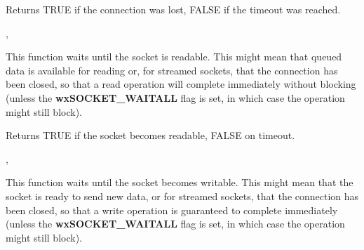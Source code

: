 


Returns TRUE if the connection was lost, FALSE if the timeout was reached.


,

%
%
\label{wxsocketbasewaitforread}


This function waits until the socket is readable. This might mean that
queued data is available for reading or, for streamed sockets, that
the connection has been closed, so that a read operation will complete
immediately without blocking (unless the {\bf wxSOCKET\_WAITALL} flag
is set, in which case the operation might still block).





Returns TRUE if the socket becomes readable, FALSE on timeout.


, 

%
%
\label{wxsocketbasewaitforwrite}


This function waits until the socket becomes writable. This might mean that
the socket is ready to send new data, or for streamed sockets, that the
connection has been closed, so that a write operation is guaranteed to
complete immediately (unless the {\bf wxSOCKET\_WAITALL} flag is set,
in which case the operation might still block).

